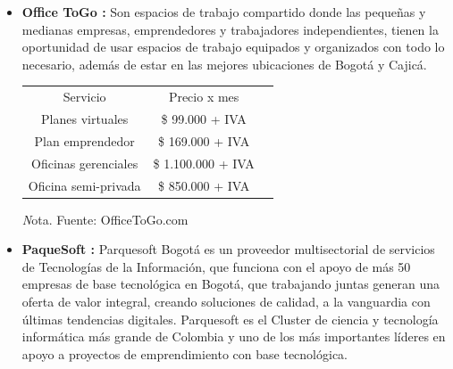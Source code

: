 \begin{itemize}
    
    \item \textbf{Office ToGo :} Son espacios de trabajo compartido donde las pequeñas y medianas empresas, emprendedores y trabajadores independientes, tienen la oportunidad de usar espacios de trabajo equipados y organizados con todo lo necesario, además de estar en las mejores ubicaciones de Bogotá y Cajicá.
    
    \begin{adjustbox}{
            center,
            caption=[{Precios Oficinas de Office ToGo}]{Oficinas de Office ToGo. },
            label={Office},
            nofloat=table, vspace={20px}}
            {
            \begin{threeparttable}
           \begin{tabular}{|cllll|cllll|p{7cm}}
            \cline{1-10}
            \multicolumn{5}{|c|}{\cellcolor[HTML]{D9EAD3}Servicio} & \multicolumn{5}{c|}{\cellcolor[HTML]{D9EAD3}Precio x mes} &  \\ \cline{1-10}
            \multicolumn{5}{|c|}{Planes virtuales}     & \multicolumn{5}{c|}{\$ 99.000 + IVA}    &  \\ \cline{1-10}
            \multicolumn{5}{|c|}{Plan emprendedor}     & \multicolumn{5}{c|}{\$ 169.000 + IVA}   &  \\ \cline{1-10}
            \multicolumn{5}{|c|}{Oficinas gerenciales} & \multicolumn{5}{c|}{\$ 1.100.000 + IVA} &  \\ \cline{1-10}
            \multicolumn{5}{|c|}{Oficina semi-privada}  & \multicolumn{5}{c|}{\$ 850.000 + IVA}   &  \\ \cline{1-10}
            \end{tabular}%
            
            \begin{tablenotes}
                \vspace{2mm}
                \textit Nota. Fuente: OfficeToGo.com 
            \end{tablenotes}
            
            \end{threeparttable} 
            }        
    \end{adjustbox}
    \item \textbf{PaqueSoft :} Parquesoft Bogotá es un proveedor multisectorial de servicios de Tecnologías de la Información, que funciona con el apoyo de más 50 empresas de base tecnológica en Bogotá, que trabajando juntas generan una oferta de valor integral, creando soluciones de calidad, a la vanguardia con últimas tendencias digitales. Parquesoft es el Cluster de ciencia y tecnología informática más grande de Colombia y uno de los más importantes líderes en apoyo a proyectos de emprendimiento con base tecnológica.
    

\end{itemize}
